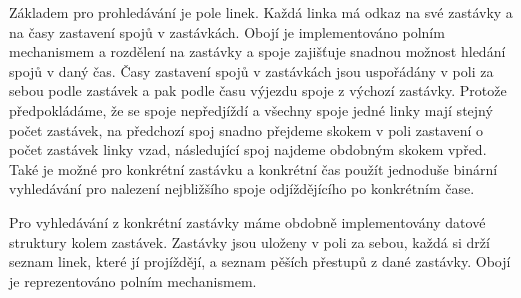 Základem pro prohledávání je pole linek. Každá linka má odkaz na své zastávky a
na časy zastavení spojů v zastávkách. Obojí je implementováno polním mechanismem
a rozdělení na zastávky a spoje zajišťuje snadnou možnost hledání spojů v daný
čas. Časy zastavení spojů v zastávkách jsou uspořádány v poli za sebou podle
zastávek a pak podle času výjezdu spoje z výchozí zastávky. Protože
předpokládáme, že se spoje nepředjíždí a všechny spoje jedné linky mají stejný
počet zastávek, na předchozí spoj snadno přejdeme skokem v poli zastavení o
počet zastávek linky vzad, následující spoj najdeme obdobným skokem vpřed. Také
je možné pro konkrétní zastávku a konkrétní čas použít jednoduše binární
vyhledávání pro nalezení nejbližšího spoje odjíždějícího po konkrétním čase. 

Pro vyhledávání z konkrétní zastávky máme obdobně implementovány datové
struktury kolem zastávek. Zastávky jsou uloženy v poli za sebou, každá si drží
seznam linek, které jí projíždějí, a seznam pěších přestupů z dané zastávky. 
Obojí je reprezentováno polním mechanismem.   

